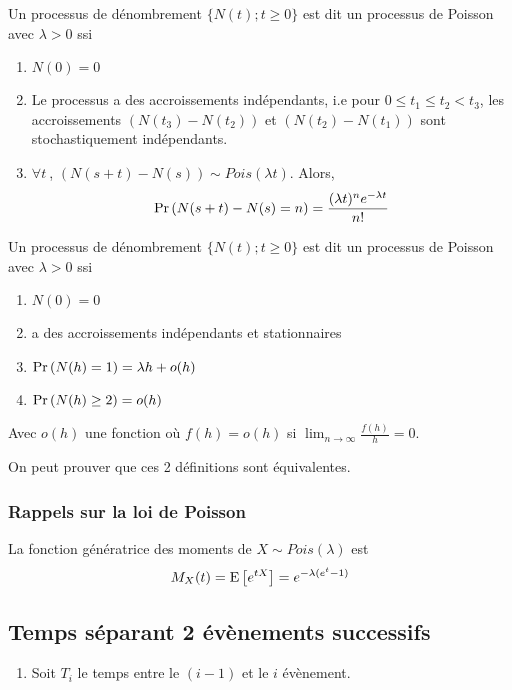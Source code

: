 \documentclass[10pt, french, landscape]{article}
\begin{document}
\begin{multicols*}{2}
\begin{definition}[Définition 1]
Un processus de dénombrement $\{N(t) ; t \geq 0 \}$ est dit un processus de Poisson avec $\lambda >0$ ssi
\begin{enumerate}[label=(\arabic*)]
\item $N(0)=0$
\item Le processus a des accroissements indépendants, i.e pour $0 \leq t_1 \leq t_2 < t_3$, les accroissements $(N(t_3) - N(t_2))$ et $(N(t_2)-N(t_1))$ sont stochastiquement indépendants.
\item $\forall t \ $, $(N(s+t) - N(s)) \sim Pois(\lambda t)$. Alors,
\begin{align*}
\Pr \left( N(s+t) - N(s) = n \right) = \frac{(\lambda t)^n e^{-\lambda t}}{n!}
\end{align*}
\end{enumerate}
\end{definition}

\begin{definition}[Définition 2]
Un processus de dénombrement $\{N(t) ; t \geq 0 \}$ est dit un processus de Poisson avec $\lambda>0$ ssi
\begin{enumerate}[label=(\arabic*)]
\item $N(0)=0$
\item a des accroissements indépendants et stationnaires
\item $\Pr \left( N(h) = 1 \right) = \lambda h + o(h)$
\item $\Pr \left( N(h) \geq 2 \right) = o(h)$
\end{enumerate}
Avec $o(h)$ une fonction où $f(h) = o(h)$ si $\lim_{n \to \infty} \frac{f(h)}{h} = 0$.
\end{definition}
On peut prouver que ces 2 définitions sont équivalentes.

\subsubsection*{Rappels sur la loi de Poisson}
La fonction génératrice des moments de $X \sim Pois(\lambda)$ est
\[ M_X(t) = \mathrm{E} \left[ e^{tX} \right]  = e^{-\lambda(e^{t} -1)} \]


\subsection*{Temps séparant 2 évènements successifs}\begin{enumerate}[label=\faAngleRight]
\item Soit $T_i$ le temps entre le $(i-1)$ et le $i$ évènement.


\end{enumerate}
\end{multicols*}
\end{document}
